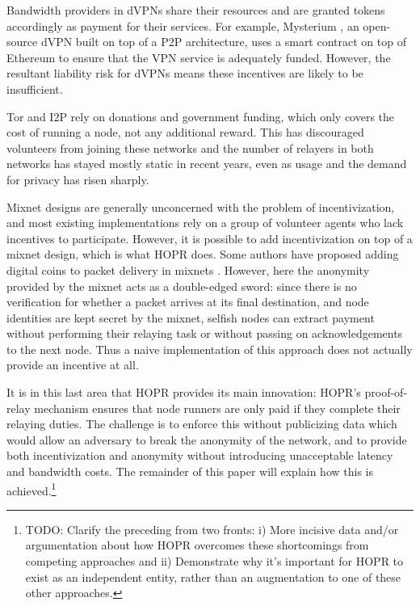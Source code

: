 Bandwidth providers in dVPNs share their resources and are granted tokens accordingly as payment for their services. For example, Mysterium \cite{mysterium}, an open-source dVPN built on top of a P2P architecture, uses a smart contract on top of Ethereum to ensure that the VPN service is adequately funded. However, the resultant liability risk for dVPNs means these incentives are likely to be insufficient.

Tor and I2P rely on donations and government funding, which only covers the cost of running a node, not any additional reward. This has discouraged volunteers from joining these networks and the number of relayers in both networks has stayed mostly static in recent years, even as usage and the demand for privacy has risen sharply.

Mixnet designs are generally unconcerned with the problem of incentivization, and most existing implementations rely on a group of volunteer agents who lack incentives to participate. However, it is possible to add incentivization on top of a mixnet design, which is what HOPR does. Some authors have proposed adding digital coins to packet delivery in mixnets \cite{MixnetCoins}. However, here the anonymity provided by the mixnet acts as a double-edged sword: since there is no verification for whether a packet arrives at its final destination, and node identities are kept secret by the mixnet, selfish nodes can extract payment without performing their relaying task or without passing on acknowledgements to the next node. Thus a naive implementation of this approach does not actually provide an incentive at all.

It is in this last area that HOPR provides its main innovation: HOPR's proof-of-relay mechanism ensures that node runners are only paid if they complete their relaying duties. The challenge is to enforce this without publicizing data which would allow an adversary to break the anonymity of the network, and to provide both incentivization and anonymity without introducing unacceptable latency and bandwidth costs. The remainder of this paper will explain how this is achieved.\footnote{TODO: Clarify the preceding from two fronts: i) More incisive data and/or argumentation about how HOPR overcomes these shortcomings from competing approaches and ii) Demonstrate why it's important for HOPR to exist as an independent entity, rather than an augmentation to one of these other approaches.}
